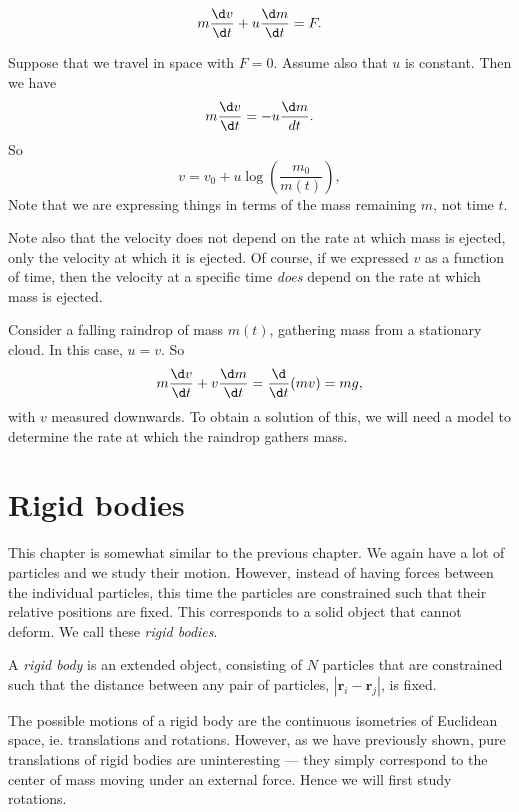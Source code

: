 \documentclass[a4paper]{article}
\begin{document}
\begin{prop}
  \[
    m\frac{\d v}{\d t} + u\frac{\d m}{\d t} = F.
  \]
\end{prop}
\begin{eg}
  Suppose that we travel in space with $F = 0$. Assume also that $u$ is constant. Then we have
  \[
    m\frac{\d v}{\d t} = -u\frac{\d m}{d t}.
  \]
  So
  \[
    v = v_0 + u \log \left(\frac{m_0}{m(t)}\right),
  \]
  Note that we are expressing things in terms of the mass remaining $m$, not time $t$.

  Note also that the velocity does not depend on the rate at which mass is ejected, only the velocity at which it is ejected. Of course, if we expressed $v$ as a function of time, then the velocity at a specific time \emph{does} depend on the rate at which mass is ejected.
\end{eg}

\begin{eg}
  Consider a falling raindrop of mass $m(t)$, gathering mass from a stationary cloud. In this case, $u = v$. So
  \[
    m\frac{\d v}{\d t} + v\frac{\d m}{\d t} = \frac{\d }{\d t}(mv) = mg,
  \]
  with $v$ measured downwards. To obtain a solution of this, we will need a model to determine the rate at which the raindrop gathers mass.
\end{eg}

\section{Rigid bodies}
This chapter is somewhat similar to the previous chapter. We again have a lot of particles and we study their motion. However, instead of having forces between the individual particles, this time the particles are constrained such that their relative positions are fixed. This corresponds to a solid object that cannot deform. We call these \emph{rigid bodies}.

\begin{defi}
  A \emph{rigid body} is an extended object, consisting of $N$ particles that are constrained such that the distance between any pair of particles, $|\mathbf{r}_i - \mathbf{r}_j|$, is fixed.
\end{defi}

The possible motions of a rigid body are the continuous isometries of Euclidean space, ie. translations and rotations. However, as we have previously shown, pure translations of rigid bodies are uninteresting --- they simply correspond to the center of mass moving under an external force. Hence we will first study rotations.
\end{document}
